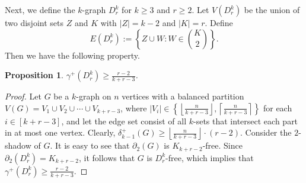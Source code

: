 \documentclass[11pt]{article}
\newtheorem{proposition}[theorem]{Proposition}
\begin{document}
Next, we define the $k$-graph $D_r^k$ for $k\ge 3$ and $r\ge 2$.
Let $V(D_r^k)$ be the union of two disjoint sets $Z$ and $K$ with $|Z|=k-2$ and $|K|=r$.
Define
\[
E(D_r^k):=\left\{Z\cup W : W\in \binom{K}{2}\right\}.
\]
Then we have the following property.
\begin{proposition}\label{pro:D graph}
$\gamma^+(D_r^k)\ge \frac{r-2}{k+r-3}$.
\end{proposition}
\begin{proof}
    Let $G$ be a $k$-graph on $n$ vertices with a balanced partition $V(G)=V_1\cup V_2\cup\cdots\cup V_{k+r-3}$, where
    $|V_i|\in\left\{\left\lfloor\frac{n}{k+r-3}\right\rfloor,\left\lceil\frac{n}{k+r-3}\right\rceil\right\}$ for each $i\in[k+r-3]$, and let the edge set consist of all $k$-sets that intersect each part in at most one vertex. Clearly, $\delta_{k-1}^+(G) \ge \left\lfloor\frac{n}{k+r-3}\right\rfloor \cdot (r-2)$.
    Consider the $2$-shadow of $G$. It is easy to see that $\partial_2(G)$ is $K_{k+r-2}$-free. Since $\partial_2(D_r^k)=K_{k+r-2}$, it follows that $G$ is $D_r^k$-free, which implies that $\gamma^+(D_r^k)\ge\frac{r-2}{k+r-3}$.
\end{proof}
\end{document}
